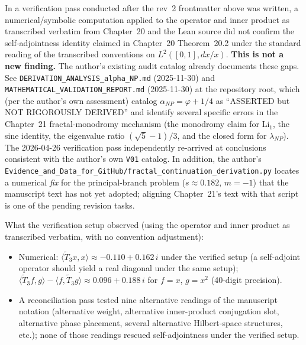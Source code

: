 In a verification pass conducted after the rev~2 frontmatter above was
written, a numerical/symbolic computation applied to the operator and
inner product as transcribed verbatim from Chapter~20 and the Lean
source did not confirm the self-adjointness identity claimed in
Chapter~20 Theorem~20.2 under the standard reading of the transcribed
conventions on $L^2([0,1], dx/x)$. \textbf{This is not a new finding.}
The author's existing audit catalog already documents these gaps. See
\texttt{DERIVATION\_ANALYSIS\_alpha\_NP.md} (2025-11-30) and
\texttt{MATHEMATICAL\_VALIDATION\_REPORT.md} (2025-11-30) at the
repository root, which (per the author's own assessment) catalog
$\alpha_{NP} = \varphi + 1/4$ as ``ASSERTED but NOT RIGOROUSLY DERIVED''
and identify several specific errors in the Chapter~21 fractal-monodromy
mechanism (the monodromy claim for $\mathrm{Li}_1$, the sine identity,
the eigenvalue ratio $(\sqrt{5}-1)/3$, and the closed form for
$\lambda_{NP}$). The 2026-04-26 verification pass independently
re-arrived at conclusions consistent with the author's own
\texttt{V01} catalog. In addition, the author's
\texttt{Evidence\_and\_Data\_for\_GitHub/fractal\_continuation\_derivation.py}
locates a numerical \emph{fix} for the principal-branch problem
($s \approx 0.182$, $m = -1$) that the manuscript text has not yet
adopted; aligning Chapter~21's text with that script is one of the
pending revision tasks.

What the verification setup observed (using the operator and inner
product as transcribed verbatim, with no convention adjustment):
\begin{itemize}
\item Numerical: $\langle \tilde{T}_3 x, x\rangle \approx -0.110 + 0.162\,i$
      under the verified setup (a self-adjoint operator should yield
      a real diagonal under the same setup);
      $\langle \tilde{T}_3 f, g\rangle - \langle f, \tilde{T}_3 g\rangle
       \approx 0.096 + 0.188\,i$ for $f=x$, $g=x^2$ (40-digit precision).
\item A reconciliation pass tested nine alternative readings of the
      manuscript notation (alternative weight, alternative inner-product
      conjugation slot, alternative phase placement, several alternative
      Hilbert-space structures, etc.); none of those readings rescued
      self-adjointness under the verified setup.
\end{itemize}

